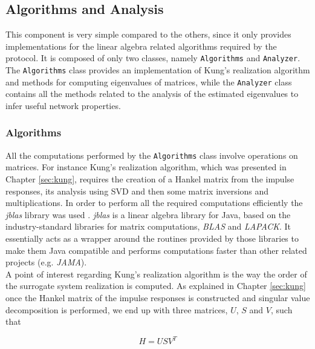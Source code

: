 \documentclass[a4paper,11pt,twoside]{report}
\newcommand{\classname}[1]{\texttt{#1}}
\begin{document}
\subsection{Algorithms and Analysis}
\label{sec:algorithms}

This component is very simple compared to the others, since it only provides implementations for the linear algebra related algorithms required by the protocol. It is composed of only two classes, namely \classname{Algorithms} and \classname{Analyzer}. The \classname{Algorithms} class provides an implementation of Kung's realization algorithm and methods for computing eigenvalues of matrices, while the \classname{Analyzer} class contains all the methods related to the analysis of the estimated eigenvalues to infer useful network properties.\\

\subsubsection*{Algorithms}

All the computations performed by the \classname{Algorithms} class involve operations on matrices. For instance Kung's realization algorithm, which was presented in Chapter \ref{sec:kung}, requires the creation of a Hankel matrix from the impulse responses, its analysis using SVD and then some matrix inversions and multiplications. In order to perform all the required computations efficiently the \textit{jblas} library was used \cite{braschmuejug10}. \textit{jblas} is a linear algebra library for Java, based on the industry-standard libraries for matrix computations, \textit{BLAS} and \textit{LAPACK}. It essentially acts as a wrapper around the routines provided by those libraries to make them Java compatible and performs computations faster than other related projects (e.g. \textit{JAMA}).\\

A point of interest regarding Kung's realization algorithm is the way the order of the surrogate system realization is computed. As explained in Chapter \ref{sec:kung} once the Hankel matrix  of the impulse responses is constructed and singular value decomposition is performed, we end up with three matrices, $U$, $S$ and $V$, such that 

\begin{equation*}
H = USV^T
\end{equation*}
\end{document}
